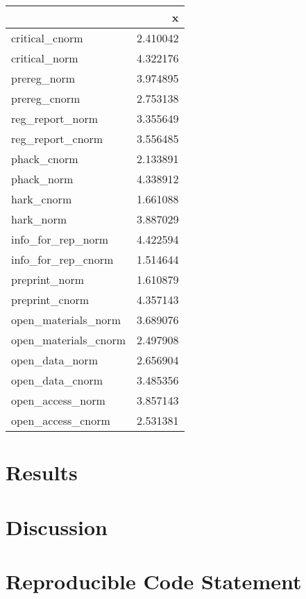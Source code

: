 \documentclass[
  man,mask,floatsintext]{apa6}
\begin{document}
\begin{tabular}{l|r}
\hline
  & x\\
\hline
critical\_cnorm & 2.410042\\
\hline
critical\_norm & 4.322176\\
\hline
prereg\_norm & 3.974895\\
\hline
prereg\_cnorm & 2.753138\\
\hline
reg\_report\_norm & 3.355649\\
\hline
reg\_report\_cnorm & 3.556485\\
\hline
phack\_cnorm & 2.133891\\
\hline
phack\_norm & 4.338912\\
\hline
hark\_cnorm & 1.661088\\
\hline
hark\_norm & 3.887029\\
\hline
info\_for\_rep\_norm & 4.422594\\
\hline
info\_for\_rep\_cnorm & 1.514644\\
\hline
preprint\_norm & 1.610879\\
\hline
preprint\_cnorm & 4.357143\\
\hline
open\_materials\_norm & 3.689076\\
\hline
open\_materials\_cnorm & 2.497908\\
\hline
open\_data\_norm & 2.656904\\
\hline
open\_data\_cnorm & 3.485356\\
\hline
open\_access\_norm & 3.857143\\
\hline
open\_access\_cnorm & 2.531381\\
\hline
\end{tabular}

\hypertarget{results}{%
\section{Results}\label{results}}

\hypertarget{discussion}{%
\section{Discussion}\label{discussion}}

\newpage

\hypertarget{reproducible-code-statement}{%
\section{Reproducible Code Statement}\label{reproducible-code-statement}}
\end{document}
